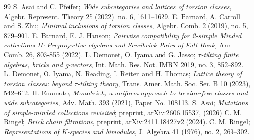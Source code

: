 \documentclass[10pt,a4paper]{amsart}
\begin{document}
\begin{thebibliography}{99}
 S. Asai and C. Pfeifer; \emph{Wide subcategories and lattices of torsion classes}, Algebr. Represent. Theory 25 (2022), no. 6, 1611--1629.
 E. Barnard, A. Carroll and S. Zhu; \emph{Minimal inclusions of torsion classes}, Algebr. Comb. 2 (2019), no. 5, 879--901.
 E. Barnard, E. J. Hanson; \emph{Pairwise compatibility for 2-simple Minded collections II: Preprojective algebras and Semibrick Pairs of Full Rank}, Ann. Comb. 26, 803-855 (2022).
 L. Demonet, O. Iyama and G. Jasso; \emph{\(\tau\)-tilting finite algebras, bricks and \(g\)-vectors}, Int. Math. Res. Not. IMRN 2019, no. 3, 852--892.
 L. Demonet, O. Iyama, N. Reading, I. Reiten and H. Thomas; \emph{Lattice theory of torsion classes: beyond \(\tau\)-tilting theory}, Trans. Amer. Math. Soc. Ser. B 10 (2023), 542--612.
 H. Enomoto; \emph{Monobrick, a uniform approach to torsion-free classes and wide subcategories}, Adv. Math. 393 (2021), Paper No. 108113.
 S. Asai; \emph{Mutations of simple-minded collections revisited}; preprint, arXiv:2606.15537, (2026)
 C. M. Ringel; \emph{Brick chain filtrations}, preprint, arXiv:2411.18427v2 (2024).
 C. M. Ringel; \emph{Representations of \(K\)-species and bimodules}, J. Algebra 41 (1976), no. 2, 269--302.
\end{thebibliography}
\end{document}
